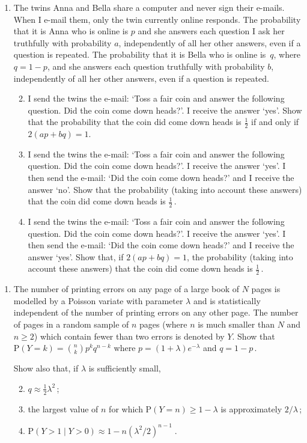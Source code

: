 \documentclass[a4, 11pt]{report}
\newlength{\qspace}
\newcounter{qnumber}
\newenvironment{question}%
 {\vspace{\qspace}
  \begin{enumerate}[\bfseries 1\quad][10]%
    \setcounter{enumi}{\value{qnumber}}%
    \item%
 }
{
  \end{enumerate}
  \filbreak
  \stepcounter{qnumber}
 }
\newenvironment{questionparts}[1][1]%
 {
  \begin{enumerate}[\bfseries (i)]%
    \setcounter{enumii}{#1}
    \addtocounter{enumii}{-1}
    \setlength{\itemsep}{5mm}
    \setlength{\parskip}{8pt}
 }
 {
  \end{enumerate}
 }
\def\P{{\mathrm P}}
\def\ge{\geqslant}
\begin{document}
\begin{question}
 The twins Anna and Bella share a computer and never sign their e-mails.
 When I e-mail them, only the twin
currently online responds.  The
 probability that it is Anna who is online is $p$ and she answers each
 question I ask her truthfully with probability $a$, independently of all her
 other answers, even if a question is repeated. The probability that it is
 Bella  who is online is~$q$, where $q=1-p$, and she answers each question
 truthfully with probability $b$, independently of all her other answers,
 even if a question is repeated.

\begin{questionparts}
\item
I send the twins the  e-mail: 
`Toss a fair coin and answer the following  question. 
Did the coin come down heads?'. I receive the answer `yes'.
Show that the probability that the coin
did come down heads is $\frac{1}{2}$ if and
only if  $2(ap+bq)=1$.

\item
I send the twins the e-mail: 
`Toss a fair coin and answer  the following question. 
Did the coin come down heads?'. I receive the answer `yes'.
I then send the e-mail: `Did the coin come down heads?' and I receive
the answer `no'. Show that the probability (taking into
account these answers) that the coin did come down heads is $\frac{1}{2}\,$.

\item
I send the twins the e-mail: `Toss a fair coin and answer the following
question. Did the coin come down heads?'. I receive the answer `yes'.
I then send the e-mail: `Did the coin come down heads?' and I receive
the answer `yes'. Show that, if $2(ap+bq)=1$,
the probability (taking into account these answers) that the coin did
come down heads is $\frac{1}{2}\,$.

\end{questionparts}
\end{question}

\begin{question}
The number of printing errors on any page of a large book of $N$ pages is 
modelled by a 
Poisson variate with parameter $\lambda$ and is statistically 
independent of the number of printing errors on any other page. The number
of pages in a random sample of $n$ pages (where $n$ is much smaller than $N$
 and $n\ge2$)
which contain fewer than two errors is denoted by $Y$.
 Show that  $\P(Y=k) = \binom n k p^kq^{n-k}$ where 
$p=(1+\lambda)e^{-\lambda}$ and $q=1-p\,$.

Show also that, if $\lambda$ is sufficiently small, 
\begin{questionparts}
\item $q\approx \frac12 \lambda^2\,$;
\item the largest value of 
$n$ for which $\P(Y=n)\ge 1-\lambda$ is approximately $2/\lambda\,$;
\item $
\P(Y>1 \;\vert\; Y>0) \approx 1-n(\lambda^2/2)^{n-1}\;.$

\end{questionparts}
\end{question}
\end{document}
